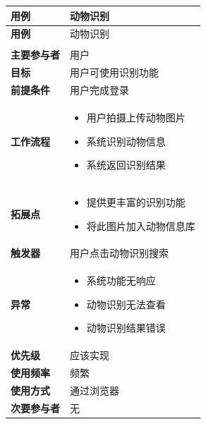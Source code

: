 \documentclass[12pt,a4paper,UTF8]{article}
\begin{document}
\begin{xltabular}{\linewidth}{|>{\raggedright\arraybackslash}p{3cm}|>{\raggedright\arraybackslash}p{8cm}|}
  \hline
  \textbf{用例} & 动物识别 \\ \hline \endfirsthead
  \hline
  \textbf{用例} & 动物识别 \\ \hline \endhead
  \hline
   \\ \endfoot
  \hline \endlastfoot

  \textbf{主要参与者} & 用户 \\ \hline
  \textbf{目标} & 用户可使用识别功能 \\ \hline
  \textbf{前提条件} & 用户完成登录 \\ \hline
  \textbf{工作流程} & 
  \vspace{-0.5em}
  \begin{itemize}[topsep=0pt, partopsep=0pt, left=0pt, nosep]
      \item 用户拍摄上传动物图片
      \item 系统识别动物信息
      \item 系统返回识别结果
  \end{itemize} \\ \hline
  \textbf{拓展点} &
  \vspace{-0.5em}
  \begin{itemize}[topsep=0pt, partopsep=0pt, left=0pt, nosep]
      \item 提供更丰富的识别功能
      \item 将此图片加入动物信息库
  \end{itemize} \\ \hline
  \textbf{触发器} & 用户点击动物识别搜索 \\ \hline
  \textbf{异常} & 
  \vspace{-0.5em}
  \begin{itemize}[topsep=0pt, partopsep=0pt, left=0pt, nosep]
      \item 系统功能无响应
      \item 动物识别无法查看
      \item 动物识别结果错误
  \end{itemize} \\ \hline
  \textbf{优先级} & 应该实现 \\ \hline
  \textbf{使用频率} & 频繁 \\ \hline
  \textbf{使用方式} & 通过浏览器 \\ \hline
  \textbf{次要参与者} & 无 \\ \hline
\end{xltabular}
\end{document}
